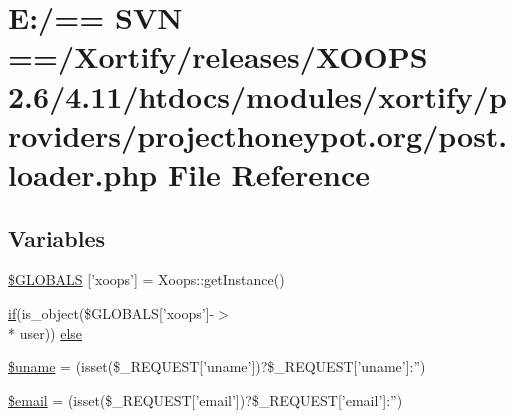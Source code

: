 \hypertarget{projecthoneypot_8org_2post_8loader_8php}{\section{E\-:/== S\-V\-N ==/\-Xortify/releases/\-X\-O\-O\-P\-S 2.6/4.11/htdocs/modules/xortify/providers/projecthoneypot.org/post.loader.\-php File Reference}
\label{projecthoneypot_8org_2post_8loader_8php}
}
\subsection*{Variables}
\begin{DoxyCompactItemize}
\item 
\hyperlink{projecthoneypot_8org_2post_8loader_8php_ad10934112c0d18cf6b358d47afa6fcf1}{\$\-G\-L\-O\-B\-A\-L\-S} \mbox{[}'xoops'\mbox{]} = Xoops\-::get\-Instance()
\item 
\hyperlink{poll_2index_8php_ae404acbb304be6b6ac443de921697faf}{if}(is\-\_\-object(\$G\-L\-O\-B\-A\-L\-S\mbox{[}'xoops'\mbox{]}-\/$>$\\*
user)) \hyperlink{projecthoneypot_8org_2post_8loader_8php_a05d5dfb2e997e7b1230ef56d742eb6c1}{else}
\item 
\hyperlink{projecthoneypot_8org_2post_8loader_8php_a227a9443cabbe5e23cfc10c4371e09d1}{\$uname} = (isset(\$\-\_\-\-R\-E\-Q\-U\-E\-S\-T\mbox{[}'uname'\mbox{]})?\$\-\_\-\-R\-E\-Q\-U\-E\-S\-T\mbox{[}'uname'\mbox{]}\-:'')
\item 
\hyperlink{projecthoneypot_8org_2post_8loader_8php_ad634f418b20382e2802f80532d76d3cd}{\$email} = (isset(\$\-\_\-\-R\-E\-Q\-U\-E\-S\-T\mbox{[}'email'\mbox{]})?\$\-\_\-\-R\-E\-Q\-U\-E\-S\-T\mbox{[}'email'\mbox{]}\-:'')
\end{DoxyCompactItemize}


